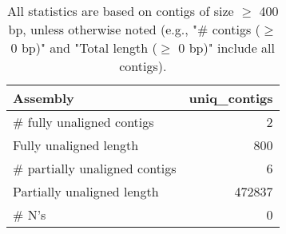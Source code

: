 \documentclass[12pt,a4paper]{article}
\begin{document}
\begin{table}[ht]
\begin{center}
\caption{All statistics are based on contigs of size $\geq$ 400 bp, unless otherwise noted (e.g., "\# contigs ($\geq$ 0 bp)" and "Total length ($\geq$ 0 bp)" include all contigs).}
\begin{tabular}{|l*{1}{|r}|}
\hline
Assembly & uniq\_contigs \\ \hline
\# fully unaligned contigs & 2 \\ \hline
Fully unaligned length & 800 \\ \hline
\# partially unaligned contigs & 6 \\ \hline
Partially unaligned length & 472837 \\ \hline
\# N's & 0 \\ \hline
\end{tabular}
\end{center}
\end{table}
\end{document}
